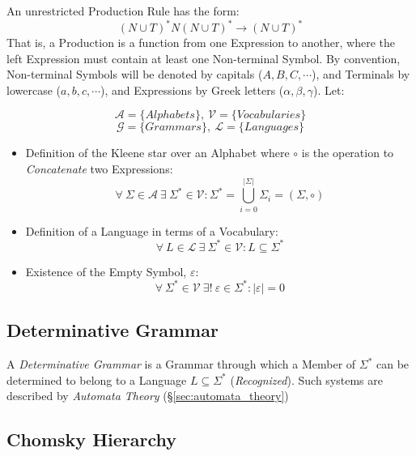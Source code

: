 An unrestricted Production Rule has the form:
\[
    (N \cup T)^*N(N \cup T)^* \rightarrow (N \cup T)^*
\]
That is, a Production is a function from one Expression to
another, where the left Expression must contain at least one
Non-terminal Symbol. By convention, Non-terminal Symbols
will be denoted by capitals ($A,B,C,\cdots$), and Terminals by
lowercase ($a,b,c,\cdots$), and Expressions by Greek letters
($\alpha,\beta,\gamma$). Let:

\[
    \mathcal{A} = \{ Alphabets \},\: \mathcal{V} = \{ Vocabularies \}
\] \[
    \mathcal{G} = \{ Grammars \},\: \mathcal{L} = \{ Languages \}
\]

\begin{itemize}

\item Definition of the Kleene star over an Alphabet where $\circ$ is
  the operation to \emph{Concatenate} two Expressions:
\[
    \forall \: \Sigma \in \mathcal{A} \:
    \exists \: \Sigma^* \in \mathcal{V}
    : \Sigma^* = \bigcup_{i=0}^{|\Sigma|} \Sigma_i
    = (\Sigma,\circ)
\]

\item Definition of a Language in terms of a Vocabulary:
\[
    \forall \: L \in \mathcal{L} \:
    \exists \: \Sigma^* \in \mathcal{V}
    : L \subseteq \Sigma^*
\]

\item Existence of the Empty Symbol, $\varepsilon$:
\[
    \forall \: \Sigma^* \in \mathcal{V} \:
    \exists ! \: \varepsilon \in \Sigma^*
    : |\varepsilon|=0
\]

\end{itemize}



\subsection{Determinative Grammar}\label{sec:determinative_grammar}

A \emph{Determinative Grammar} is a Grammar through which a Member of
$\Sigma^*$ can be determined to belong to a Language $L \subseteq
\Sigma^*$ (\emph{Recognized}). Such systems are described by
\emph{Automata Theory} (\S\ref{sec:automata_theory})



\subsection{Chomsky Hierarchy}\label{sec:chomsky_hierarchy}\cite{chomsky56}

